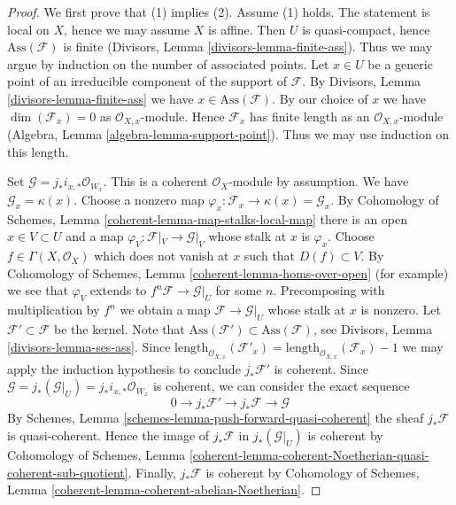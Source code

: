 \documentclass{stacks-project}
\theoremstyle{plain}
\theoremstyle{definition}
\theoremstyle{remark}
\numberwithin{equation}{subsection}
\begin{document}
\begin{proof}
We first prove that (1) implies (2). Assume (1) holds.
The statement is local on $X$, hence we may assume $X$ is affine.
Then $U$ is quasi-compact, hence $\text{Ass}(\mathcal{F})$ is finite
(Divisors, Lemma \ref{divisors-lemma-finite-ass}). Thus we may argue by
induction on the number of associated points. Let $x \in U$ be a generic
point of an irreducible component of the support of $\mathcal{F}$.
By Divisors, Lemma \ref{divisors-lemma-finite-ass} we have
$x \in \text{Ass}(\mathcal{F})$. By our choice of $x$ we have
$\dim(\mathcal{F}_x) = 0$ as $\mathcal{O}_{X, x}$-module.
Hence $\mathcal{F}_x$ has finite length as an $\mathcal{O}_{X, x}$-module
(Algebra, Lemma \ref{algebra-lemma-support-point}).
Thus we may use induction on this length.

\medskip\noindent
Set $\mathcal{G} = j_*i_{x, *}\mathcal{O}_{W_x}$. This is a coherent
$\mathcal{O}_X$-module by assumption. We have $\mathcal{G}_x = \kappa(x)$.
Choose a nonzero map
$\varphi_x : \mathcal{F}_x \to \kappa(x) = \mathcal{G}_x$.
By Cohomology of Schemes, Lemma \ref{coherent-lemma-map-stalks-local-map}
there is an open $x \in V \subset U$ and a map
$\varphi_V : \mathcal{F}|_V \to \mathcal{G}|_V$ whose stalk
at $x$ is $\varphi_x$. Choose $f \in \Gamma(X, \mathcal{O}_X)$
which does not vanish at $x$ such that $D(f) \subset V$. By
Cohomology of Schemes, Lemma \ref{coherent-lemma-homs-over-open}
(for example) we see that $\varphi_V$ extends to
$f^n\mathcal{F} \to \mathcal{G}|_U$ for some $n$.
Precomposing with multiplication by $f^n$ we obtain a map
$\mathcal{F} \to \mathcal{G}|_U$ whose stalk at $x$ is nonzero.
Let $\mathcal{F}' \subset \mathcal{F}$ be the kernel.
Note that $\text{Ass}(\mathcal{F}') \subset \text{Ass}(\mathcal{F})$, see
Divisors, Lemma \ref{divisors-lemma-ses-ass}.
Since
$\text{length}_{\mathcal{O}_{X, x}}(\mathcal{F}'_x) =
\text{length}_{\mathcal{O}_{X, x}}(\mathcal{F}_x) - 1$
we may apply the
induction hypothesis to conclude $j_*\mathcal{F}'$ is coherent.
Since $\mathcal{G} = j_*(\mathcal{G}|_U) = j_*i_{x, *}\mathcal{O}_{W_x}$
is coherent, we can consider the exact sequence
$$
0 \to j_*\mathcal{F}' \to j_*\mathcal{F} \to \mathcal{G}
$$
By Schemes, Lemma \ref{schemes-lemma-push-forward-quasi-coherent}
the sheaf $j_*\mathcal{F}$ is quasi-coherent.
Hence the image of $j_*\mathcal{F}$ in $j_*(\mathcal{G}|_U)$
is coherent by Cohomology of Schemes, Lemma
\ref{coherent-lemma-coherent-Noetherian-quasi-coherent-sub-quotient}.
Finally, $j_*\mathcal{F}$ is coherent by
Cohomology of Schemes, Lemma \ref{coherent-lemma-coherent-abelian-Noetherian}.


\end{proof}
\end{document}
